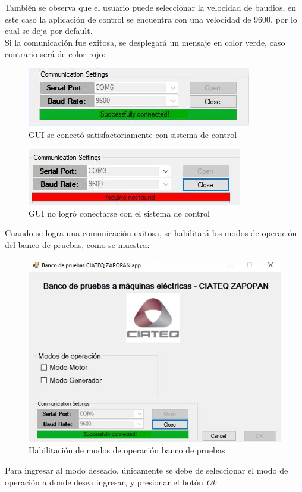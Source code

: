 \documentclass[12pt,titlepage]{article}
\begin{document}
También se observa que el usuario puede seleccionar la velocidad de baudios, en este caso la aplicación de control se encuentra con una velocidad de 9600, por lo cual se deja por default. \\

\newpage
Si la comunicación fue exitosa, se desplegará un mensaje en color verde, caso contrario será de color rojo: \\

\begin{figure}[htbp]
\hspace*{4.5cm} 
\includegraphics[scale=0.88]{exito}
\caption{GUI se conectó satisfactoriamente con sistema de control}
\end{figure}

\begin{figure}[htbp]
\hspace*{4.5cm} 
\includegraphics[scale=0.88]{fail}
\caption{GUI no logró conectarse con el sistema de control}
\end{figure}

Cuando se logra una comunicación exitosa, se habilitará los modos de operación del banco de pruebas, como se muestra: \\

\begin{figure}[htbp]
\hspace*{3.8cm} 
\includegraphics[scale=0.72]{Connected}
\caption{Habilitación de modos de operación banco de pruebas}
\end{figure}
\newpage
Para ingresar al modo deseado, únicamente se debe de seleccionar el modo de operación a donde desea ingresar, y presionar el botón \textit{Ok} 
\end{document}
